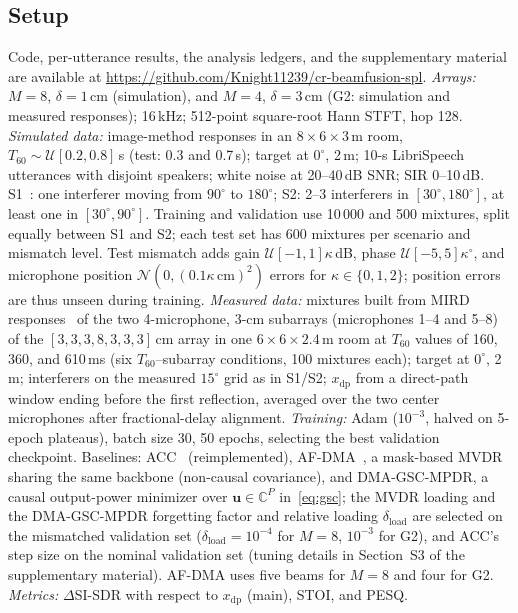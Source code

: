 \documentclass[journal]{IEEEtran}
\newcommand{\supp}{the supplementary material}
\begin{document}
\subsection{Setup}
Code, per-utterance results, the analysis ledgers, and the supplementary material are available at \url{https://github.com/Knight11239/cr-beamfusion-spl}. \emph{Arrays:} $M=8$, $\delta=1$\,cm (simulation), and $M=4$, $\delta=3$\,cm (G2: simulation and measured responses); 16\,kHz; 512-point square-root Hann STFT, hop 128. \emph{Simulated data:} image-method responses in an $8\times6\times3$\,m room, $T_{60}\sim\mathcal U[0.2,0.8]$\,s (test: 0.3 and 0.7\,s); target at $0^\circ$, 2\,m; 10-s LibriSpeech~\cite{panayotov2015librispeech} utterances with disjoint speakers; white noise at 20--40\,dB SNR; SIR 0--10\,dB. S1~\cite{qian2026beamfusion}: one interferer moving from $90^\circ$ to $180^\circ$; S2: 2--3 interferers in $[30^\circ,180^\circ]$, at least one in $[30^\circ,90^\circ]$. Training and validation use 10\,000 and 500 mixtures, split equally between S1 and S2; each test set has 600 mixtures per scenario and mismatch level. Test mismatch adds gain $\mathcal U[-1,1]\kappa$\,dB, phase $\mathcal U[-5,5]\kappa^\circ$, and microphone position $\mathcal N(0,(0.1\kappa\,\mathrm{cm})^2)$ errors for $\kappa\in\{0,1,2\}$; position errors are thus unseen during training. \emph{Measured data:} mixtures built from MIRD responses~\cite{hadad2014mird} of the two 4-microphone, 3-cm subarrays (microphones 1--4 and 5--8) of the $[3,3,3,8,3,3,3]$\,cm array in one $6\times6\times2.4$\,m room at $T_{60}$ values of 160, 360, and 610\,ms (six $T_{60}$--subarray conditions, 100 mixtures each); target at $0^\circ$, 2\,m; interferers on the measured $15^\circ$ grid as in S1/S2; $x_{\mathrm{dp}}$ from a direct-path window ending before the first reflection, averaged over the two center microphones after fractional-delay alignment. \emph{Training:} Adam ($10^{-3}$, halved on 5-epoch plateaus), batch size 30, 50 epochs, selecting the best validation checkpoint. Baselines: ACC~\cite{jin2024acc} (reimplemented), AF-DMA~\cite{zhao2025afdma}, a mask-based MVDR sharing the same backbone (non-causal covariance), and DMA-GSC-MPDR, a causal output-power minimizer over $\mathbf u\in\mathbb C^P$ in~\eqref{eq:gsc}; the MVDR loading and the DMA-GSC-MPDR forgetting factor and relative loading $\delta_{\mathrm{load}}$ are selected on the mismatched validation set ($\delta_{\mathrm{load}}=10^{-4}$ for $M=8$, $10^{-3}$ for G2), and ACC's step size on the nominal validation set (tuning details in Section~S3 of \supp). AF-DMA uses five beams for $M=8$ and four for G2. \emph{Metrics:} $\Delta$SI-SDR with respect to $x_{\mathrm{dp}}$ (main), STOI, and PESQ.
\end{document}
